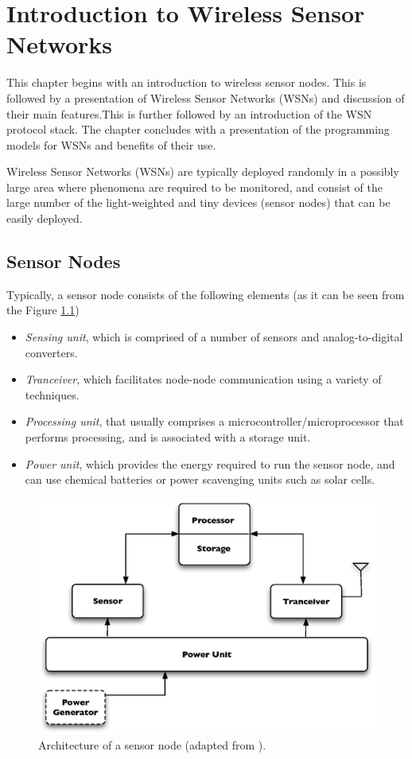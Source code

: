 \chapter{Introduction to Wireless Sensor Networks}

This chapter begins with an introduction to wireless sensor nodes. This is followed
by a presentation of Wireless Sensor Networks (WSNs) and discussion of their
main features.This is further followed by an introduction of the WSN protocol
stack. The chapter concludes with a presentation of the programming models for
WSNs and benefits of their use.

Wireless Sensor Networks (WSNs) are typically deployed randomly in a possibly
large area where phenomena are required to be monitored, and consist of the
large number of the light-weighted and tiny devices (sensor nodes) that can be
easily deployed. 

\section{Sensor Nodes} \label{subsec:sensornodes}

Typically, a sensor node consists of the following elements (as it can be seen
from the Figure \ref{Fig:SensorNodeArch})
\begin{itemize}
  \item \emph{Sensing unit}, which is comprised of a number of sensors and
  analog-to-digital converters. 
  \item \emph{Tranceiver}, which facilitates node-node communication using 
a variety of techniques.
  \item \emph{Processing unit}, that usually comprises a 
microcontroller/microprocessor that performs processing, and is associated with 
a storage unit.
  \item \emph{Power unit}, which provides the energy required to run the sensor node, and can use chemical 
batteries or power scavenging units such as solar cells.
\end{itemize}

\begin{figure}[h]
\centering
\includegraphics[scale=0.65]{img/SensorNodeArch.eps} 
\caption[Architecture of a sensor node] {Architecture of a sensor node (adapted from \cite{SensorSurveyAkyildiz:2002}).}
\label{Fig:SensorNodeArch}
\end{figure} 

